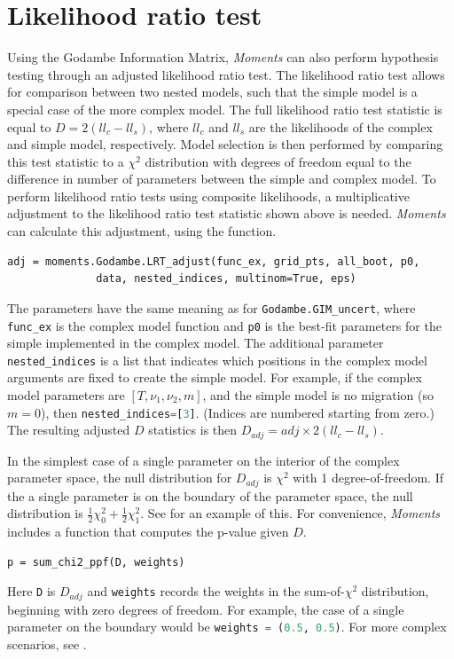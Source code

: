 \documentclass[12pt]{article}
\makeatletter
\newcommand{\py}[1]{\lstinline[language=Python, showstringspaces=False]@#1@}
\makeatother
\begin{document}
\section{Likelihood ratio test}
Using the Godambe Information Matrix, \textit{Moments} can also perform hypothesis testing through an adjusted likelihood ratio test.
The likelihood ratio test allows for comparison between two nested models, such that the simple model is a special case of the more complex model.
The full likelihood ratio test statistic is equal to $D = 2(ll_{c}-ll_{s})$, where $ll_{c}$ and $ll_{s}$ are the likelihoods of the complex and simple model, respectively.
Model selection is then performed by comparing this test statistic to a $\chi^2$ distribution with degrees of freedom equal to the difference in number of parameters between the simple and complex model.
To perform likelihood ratio tests using composite likelihoods, a multiplicative adjustment to the likelihood ratio test statistic shown above is needed.
\textit{Moments} can calculate this adjustment, using the function.
\begin{lstlisting}
adj = moments.Godambe.LRT_adjust(func_ex, grid_pts, all_boot, p0, 
			  data, nested_indices, multinom=True, eps)
\end{lstlisting}
The parameters have the same meaning as for \py{Godambe.GIM_uncert}, where \py{func_ex} is the complex model function and \py{p0} is the best-fit parameters for the simple implemented in the complex model.
The additional parameter \py{nested_indices} is a list that indicates which positions in the complex model arguments are fixed to create the simple model.
For example, if the complex model parameters are $[T, \nu_1, \nu_2, m]$, and the simple model is no migration (so $m = 0$), then \py{nested_indices=[3]}.
(Indices are numbered starting from zero.)
The resulting adjusted $D$ statistics is then $D_{adj} = adj \times 2(ll_{c}-ll_{s})$.

In the simplest case of a single parameter on the interior of the complex parameter space, the null distribution for $D_{adj}$ is $\chi^2$ with 1 degree-of-freedom.
If the a single parameter is on the boundary of the parameter space, the null distribution is $\frac{1}{2}\chi^2_0 + \frac{1}{2}\chi^2_1$.
See \cite{Coffman2015} for an example of this.
For convenience, \textit{Moments} includes a function that computes the p-value given $D$.
\begin{lstlisting}
p = sum_chi2_ppf(D, weights)
\end{lstlisting}
Here \py{D} is $D_{adj}$ and \py{weights} records the weights in the sum-of-$\chi^2$ distribution, beginning with zero degrees of freedom.
For example, the case of a single parameter on the boundary would be \py{weights = (0.5, 0.5)}.
For more complex scenarios, see \cite{Self1987}.
\end{document}
